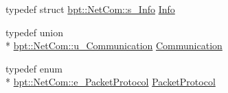 \begin{DoxyCompactItemize}
\item 
typedef struct \hyperlink{structbpt_1_1_net_com_1_1s___info}{bpt\-::\-Net\-Com\-::s\-\_\-\-Info} \hyperlink{namespacebpt_1_1_net_com_ad2f0a143a2bfc9b23ad2c84f418ee103}{Info}
\item 
typedef union \\*
\hyperlink{unionbpt_1_1_net_com_1_1u___communication}{bpt\-::\-Net\-Com\-::u\-\_\-\-Communication} \hyperlink{namespacebpt_1_1_net_com_af30d27373a967c6e6bcbf97963e2ab1d}{Communication}
\item 
typedef enum \\*
\hyperlink{namespacebpt_1_1_net_com_a9fe17665f9f84a23e9f941d317acdd5e}{bpt\-::\-Net\-Com\-::e\-\_\-\-Packet\-Protocol} \hyperlink{namespacebpt_1_1_net_com_ae55ee05019d82af5d3cc17e7e0ebedff}{Packet\-Protocol}
\end{DoxyCompactItemize}
